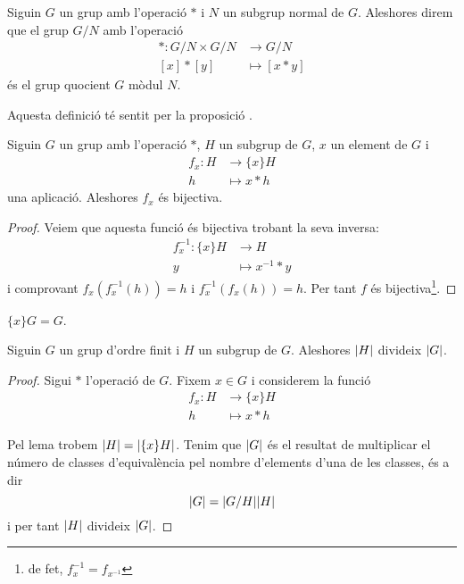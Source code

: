 \documentclass[../Apunts.tex]{subfiles}
\begin{document}
	\begin{definition}
		\label{def:grup quocient}\label{def:relació d'equivalència entre grups}\label{def:producte entre classes versió grups}
		Siguin \(G\) un grup amb l'operació \(\ast\) i \(N\) un subgrup normal de \(G\). Aleshores direm que el grup \(G/N\) amb l'operació
		\begin{align*}
		\ast\colon G/N\times G/N&\longrightarrow G/N\\
		[x]\ast[y]&\longmapsto[x\ast y]
		\end{align*}
		és el grup quocient \(G\) mòdul \(N\).
		
		Aquesta definició té sentit per la proposició .
	\end{definition}
	\begin{lemma}
		\label{lema:operar en grups és bijectiu}
		Siguin \(G\) un grup amb l'operació \(\ast\), \(H\) un subgrup de \(G\), \(x\) un element de \(G\) i
		\begin{align*}
		f_{x}\colon H&\longrightarrow\{x\}H\\
		h&\longmapsto x\ast h
		\end{align*}
		una aplicació. Aleshores \(f_{x}\) és bijectiva.
		\begin{proof}
			Veiem que aquesta funció és bijectiva trobant la seva inversa:
			\begin{align*}
			f_{x}^{-1}\colon\{x\}H&\longrightarrow H\\
			y&\longmapsto x^{-1}\ast y
			\end{align*}
			i comprovant \(f_{x}(f_{x}^{-1}(h))=h\) i \(f_{x}^{-1}(f_{x}(h))=h\). Per tant \(f\) és bijectiva\footnote{de fet, \(f_{x}^{-1}=f_{x^{-1}}\)}. %
		\end{proof}
	\end{lemma}
	\begin{observation}
		\(\{x\}G=G\).
	\end{observation}
	\begin{theorem}
		\label{thm:Teorema de Lagrange}
		Siguin \(G\) un grup d'ordre finit i \(H\) un subgrup de \(G\). Aleshores \(\abs{H}\) divideix \(\abs{G}\).
		\begin{proof}
			Sigui \(\ast\) l'operació de \(G\). Fixem \(x\in G\) i considerem la funció
			\begin{align*}
			f_{x}\colon H&\longrightarrow\{x\}H\\
			h&\longmapsto x\ast h
			\end{align*}
			
			Pel lema  trobem \(\abs{H}=\abs{\{x\}H}\). Tenim que \(\abs{G}\) és el resultat de multiplicar el número de classes d'equivalència pel nombre d'elements d'una de les classes, és a dir %
			\[\abs{G}=\abs{G/H}\abs{H}\]
			i per tant \(\abs{H}\) divideix \(\abs{G}\).
		\end{proof}
	\end{theorem}
\end{document}
